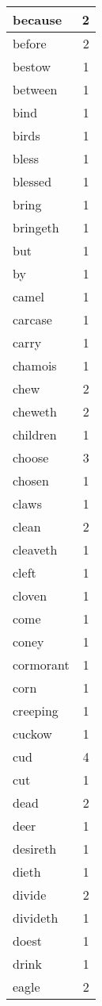 \begin{center}
\begin{longtable}{l|r}
because & 2 \\ \hline
before & 2 \\ \hline
bestow & 1 \\ \hline
between & 1 \\ \hline
bind & 1 \\ \hline
birds & 1 \\ \hline
bless & 1 \\ \hline
blessed & 1 \\ \hline
bring & 1 \\ \hline
bringeth & 1 \\ \hline
but & 1 \\ \hline
by & 1 \\ \hline
camel & 1 \\ \hline
carcase & 1 \\ \hline
carry & 1 \\ \hline
chamois & 1 \\ \hline
chew & 2 \\ \hline
cheweth & 2 \\ \hline
children & 1 \\ \hline
choose & 3 \\ \hline
chosen & 1 \\ \hline
claws & 1 \\ \hline
clean & 2 \\ \hline
cleaveth & 1 \\ \hline
cleft & 1 \\ \hline
cloven & 1 \\ \hline
come & 1 \\ \hline
coney & 1 \\ \hline
cormorant & 1 \\ \hline
corn & 1 \\ \hline
creeping & 1 \\ \hline
cuckow & 1 \\ \hline
cud & 4 \\ \hline
cut & 1 \\ \hline
dead & 2 \\ \hline
deer & 1 \\ \hline
desireth & 1 \\ \hline
dieth & 1 \\ \hline
divide & 2 \\ \hline
divideth & 1 \\ \hline
doest & 1 \\ \hline
drink & 1 \\ \hline
eagle & 2 \\ \hline

\end{longtable}
\end{center}

